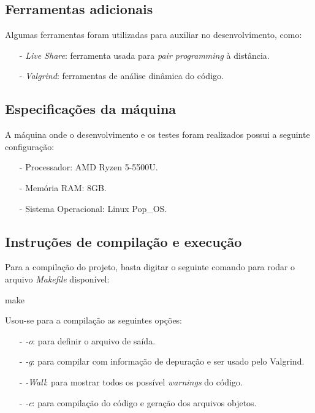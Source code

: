 \documentclass{article}
\begin{document}
\subsection{Ferramentas adicionais}
Algumas ferramentas foram utilizadas para auxiliar no desenvolvimento, como:
\begin{itemize}
    \item[-] \textit{Live Share}: ferramenta usada para \textit{pair programming} à distância.
    \item[-] \textit{Valgrind}: ferramentas de análise dinâmica do código.
\end{itemize}

\subsection{Especificações da máquina}
A máquina onde o desenvolvimento e os testes foram realizados possui a seguinte configuração:
\begin{itemize}
    \item[-] Processador: AMD Ryzen 5-5500U.
    \item[-] Memória RAM: 8GB.
    \item[-] Sistema Operacional: Linux Pop\_OS.
\end{itemize}

\subsection{Instruções de compilação e execução}

Para a compilação do projeto, basta digitar o seguinte comando para rodar o arquivo \textit{Makefile} disponível:

\begin{tcolorbox}[title=Compilando o projeto,width=\linewidth]
    make
\end{tcolorbox}

Usou-se para a compilação as seguintes opções:
\begin{itemize}
    \item [-] \emph{-o}: para definir o arquivo de saída.
    \item [-] \emph{-g}: para compilar com informação de depuração e ser usado pelo Valgrind.
    \item [-] \emph{-Wall}: para mostrar todos os possível \emph{warnings} do código.
    \item [-] \emph{-c}: para compilação do código e geração dos arquivos objetos.
\end{itemize}
\end{document}
